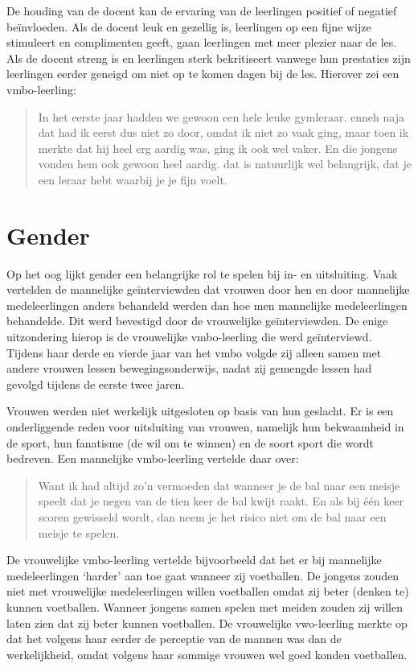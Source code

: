 \documentclass[a4paper,12pt]{memoir}
\begin{document}
De houding van de docent kan de ervaring van de leerlingen positief of negatief beïnvloeden. Als de docent leuk en gezellig is, leerlingen op een fijne wijze stimuleert en complimenten geeft, gaan leerlingen met meer plezier naar de les. Als de docent streng is en leerlingen sterk bekritiseert vanwege hun prestaties zijn leerlingen eerder geneigd om niet op te komen dagen bij de les. Hierover zei een vmbo-leerling:

\begin{quote}In het eerste jaar hadden we gewoon een hele leuke gymleraar. enneh naja dat had ik eerst dus niet zo door, omdat ik niet zo vaak ging, maar toen ik merkte dat hij heel erg aardig was, ging ik ook wel vaker. En die jongens vonden hem ook gewoon heel aardig. dat is natuurlijk wel belangrijk, dat je een leraar hebt waarbij je je fijn voelt.\end{quote}

\section{Gender}

Op het oog lijkt gender een belangrijke rol te spelen bij in- en uitsluiting. Vaak vertelden de mannelijke geïnterviewden dat vrouwen door hen en door mannelijke medeleerlingen anders behandeld werden dan hoe men mannelijke medeleerlingen behandelde. Dit werd bevestigd door de vrouwelijke geïnterviewden. De enige uitzondering hierop is de vrouwelijke vmbo-leerling die werd geïnterviewd. Tijdens haar derde en vierde jaar van het vmbo volgde zij alleen samen met andere vrouwen lessen bewegingsonderwijs, nadat zij gemengde lessen had gevolgd tijdens de eerste twee jaren.

Vrouwen werden niet werkelijk uitgesloten op basis van hun geslacht. Er is een onderliggende reden voor uitsluiting van vrouwen, namelijk hun bekwaamheid in de sport, hun fanatisme (de wil om te winnen) en de soort sport die wordt bedreven. Een mannelijke vmbo-leerling vertelde daar over:

\begin{quote}Want ik had altijd zo'n vermoeden dat wanneer je de bal naar een meisje speelt dat je negen van de tien keer de bal kwijt raakt. En als bij één keer scoren gewisseld wordt, dan neem je het risico niet om de bal naar een meisje te spelen.\end{quote}

De vrouwelijke vmbo-leerling vertelde bijvoorbeeld dat het er bij mannelijke medeleerlingen `harder' aan toe gaat wanneer zij voetballen. De jongens zouden niet met vrouwelijke medeleerlingen willen voetballen omdat zij beter (denken te) kunnen voetballen. Wanneer jongens samen spelen met meiden zouden zij willen laten zien dat zij beter kunnen voetballen. De vrouwelijke vwo-leerling merkte op dat het volgens haar eerder de perceptie van de mannen was dan de werkelijkheid, omdat volgens haar sommige vrouwen wel goed konden voetballen.
\end{document}
